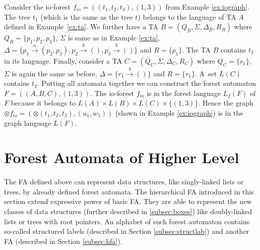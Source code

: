 \bexmp
Consider the io-forest $f_{io}=((t_1,t_2,t_3), (1,3))$ from Example \ref{ex:iograph}.
The tree $t_1$ (which is the same as the tree $t$) belongs to the language of TA $A$
defined in Example~\ref{ex:ta}.
We further have a TA $B=(Q_B,\Sigma, \Delta_B, R_B)$ where $Q_B=\{p_1,p_2,p_3\}$,
$\Sigma$ is same as in Example \ref{ex:ta},
$\Delta=\{p_1 \xrightarrow{a} (p_2,p_3),
p_2 \xrightarrow{b} (),
p_3 \xrightarrow{b} ()\}$
and $R=\{p_1\}$.
The TA $B$ contains $t_2$ in its language.
Finally, consider a TA $C=(Q_C,\Sigma, \Delta_C, R_C)$ where $Q_C=\{r_1\}$,
$\Sigma$ is again the same as before,
$\Delta= \{r_1 \xrightarrow{b} ()\}$
and $R=\{r_1\}$.
A~set $L(C)$ contains $t_3$.
Putting all automata together we can construct the forest automaton $F=((A,B,C),(1,3))$.
The io-forest $f_{io}$ is in the forest language $L_f(F)$ of $F$ because it belongs
to $L(A) \times L(B) \times L(C) \times \{(1,3)\}$.
Hence the graph $\otimes f_{io} = (\otimes (t_1,t_2,t_3),(u_1,w_1))$
(shown in Example \ref{ex:iograph}) is in the graph language $L(F)$.
\eexmp

\section{Forest Automata of Higher Level}
\label{sec:fah}

The FA defined above can represent data structures, like singly-linked lists or trees,
by already defined forest automata.
The hierarchical FA introduced in this section extend expressive power of basic FA.
They are able to represent the new classes of data structures (further described in \ref{subsec:boxes})
like doubly-linked lists or trees with root pointers.
An alphabet of such forest automaton contains
so-called structured labels (described in Section \ref{subsec:structlab})
and another FA (described in Section \ref{subsec:hfa}).


